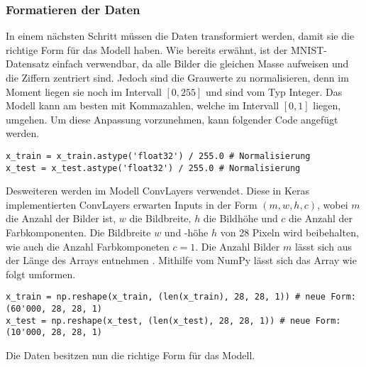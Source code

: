 \subsubsection{Formatieren der Daten}
In einem nächsten Schritt müssen die Daten transformiert werden, damit sie die
richtige Form für das Modell haben.
Wie bereits erwähnt, ist der MNIST-Datensatz einfach verwendbar,
da alle Bilder die gleichen Masse aufweisen und die Ziffern zentriert sind.
\para{}
Jedoch sind die Grauwerte zu normalisieren, denn im Moment liegen sie noch im
Intervall $[0, 255]$ und sind vom Typ Integer.
Das Modell kann am besten mit Kommazahlen, welche im Intervall $[0,1]$ liegen,
umgehen. Um diese Anpassung vorzunehmen, kann folgender Code angefügt werden.
\begin{verbatim}
x_train = x_train.astype('float32') / 255.0 # Normalisierung
x_test = x_test.astype('float32') / 255.0 # Normalisierung
\end{verbatim}
Desweiteren werden im Modell ConvLayers verwendet. Diese in Keras
implementierten ConvLayers erwarten Inputs in der Form $(m, w, h, c)$, wobei
$m$ die Anzahl der Bilder ist, $w$ die Bildbreite, $h$ die Bildhöhe und $c$ die
Anzahl der Farbkomponenten. Die Bildbreite $w$ und -höhe $h$ von 28 Pixeln wird beibehalten, wie auch
die Anzahl Farbkomponeten $c=1$. Die Anzahl Bilder $m$ lässt sich aus der Länge
des Arrays entnehmen . Mithilfe vom NumPy lässt sich das Array wie folgt umformen.
\begin{verbatim}
x_train = np.reshape(x_train, (len(x_train), 28, 28, 1)) # neue Form: (60'000, 28, 28, 1)
x_test = np.reshape(x_test, (len(x_test), 28, 28, 1)) # neue Form: (10'000, 28, 28, 1)
\end{verbatim}
Die Daten besitzen nun die richtige Form für das Modell.

